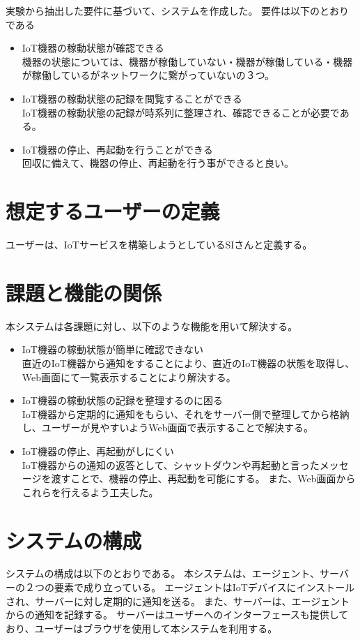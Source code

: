 実験から抽出した要件に基づいて、システムを作成した。
要件は以下のとおりである
\begin{itemize}
	\item IoT機器の稼動状態が確認できる\\
		機器の状態については、機器が稼働していない・機器が稼働している・機器が稼働しているがネットワークに繋がっていないの３つ。
	\item IoT機器の稼動状態の記録を閲覧することができる\\
		IoT機器の稼動状態の記録が時系列に整理され、確認できることが必要である。
	\item IoT機器の停止、再起動を行うことができる\\
		回収に備えて、機器の停止、再起動を行う事ができると良い。
\end{itemize}

\section{想定するユーザーの定義}
ユーザーは、IoTサービスを構築しようとしているSIさんと定義する。

\section{課題と機能の関係}
本システムは各課題に対し、以下のような機能を用いて解決する。
\begin{itemize}
\item IoT機器の稼動状態が簡単に確認できない\\
	直近のIoT機器から通知をすることにより、直近のIoT機器の状態を取得し、Web画面にて一覧表示することにより解決する。
\item IoT機器の稼動状態の記録を整理するのに困る\\
	IoT機器から定期的に通知をもらい、それをサーバー側で整理してから格納し、ユーザーが見やすいようWeb画面で表示することで解決する。
\item IoT機器の停止、再起動がしにくい\\
	IoT機器からの通知の返答として、シャットダウンや再起動と言ったメッセージを渡すことで、機器の停止、再起動を可能にする。
	また、Web画面からこれらを行えるよう工夫した。
\end{itemize}

\section{システムの構成}
システムの構成は以下のとおりである。
本システムは、エージェント、サーバーの２つの要素で成り立っている。
エージェントはIoTデバイスにインストールされ、サーバーに対し定期的に通知を送る。
また、サーバーは、エージェントからの通知を記録する。
サーバーはユーザーへのインターフェースも提供しており、ユーザーはブラウザを使用して本システムを利用する。

